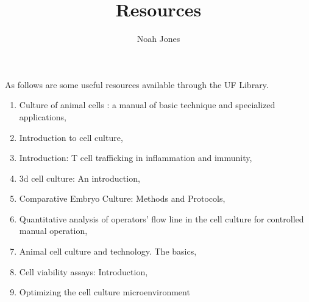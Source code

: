 \documentclass[11pt, oneside]{article}   	%
\title{Resources}
\author{Noah Jones}
\date{}							%
\begin{document}
\maketitle

As follows are some useful resources available through the UF Library.

\begin{enumerate}
\item Culture of animal cells : a manual of basic technique and specialized applications\cite{ufl.03670122420160101}, 
\item Introduction to cell culture\cite{springer.975CDA4320110101}, 
\item Introduction: T cell trafficking in inflammation and immunity\cite{springer.49F8CB7520170101}, 
\item 3d cell culture: An introduction\cite{springer.171CD9820170101}, 
\item Comparative Embryo Culture: Methods and Protocols\cite{ufl.03703333520190101}, 
\item Quantitative analysis of operators’ flow line in the cell culture for controlled manual operation\cite{S235232041830069520191215}, 
\item Animal cell culture and technology. The basics\cite{ufl.02009991520040101}, 
\item Cell viability assays: Introduction\cite{springer.21E62A9120110101}, 
\item Optimizing the cell culture microenvironment\cite{springer.66E91A0820190101}
\end{enumerate}






\end{document}
